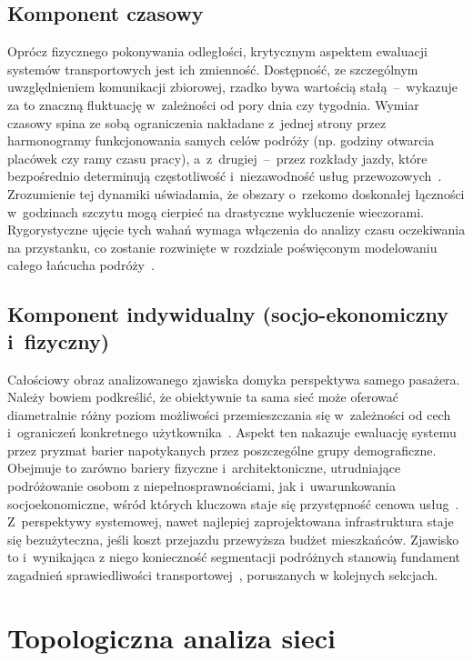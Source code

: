 \documentclass{pracamgr}
\begin{document}
\subsection{Komponent czasowy}\label{subsection:komponent_czasowy}
Oprócz fizycznego pokonywania odległości, krytycznym aspektem ewaluacji systemów transportowych jest ich zmienność. Dostępność, ze szczególnym uwzględnieniem komunikacji zbiorowej, rzadko bywa wartością stałą~–~wykazuje za to znaczną fluktuację w~zależności od pory dnia czy tygodnia. Wymiar czasowy spina ze sobą ograniczenia nakładane z~jednej strony przez harmonogramy funkcjonowania samych celów podróży (np. godziny otwarcia placówek czy ramy czasu pracy), a~z~drugiej~–~przez rozkłady jazdy, które bezpośrednio determinują częstotliwość i~niezawodność usług przewozowych~\cite{gravity2, capetown, review, LUO2019102505}. Zrozumienie tej dynamiki uświadamia, że obszary o~rzekomo doskonałej łączności w~godzinach szczytu mogą cierpieć na drastyczne wykluczenie wieczorami. Rygorystyczne ujęcie tych wahań wymaga włączenia do analizy czasu oczekiwania na przystanku, co zostanie rozwinięte w rozdziale poświęconym modelowaniu całego łańcucha podróży~\cite{capetown, LUO2019102505, elavating}.

\subsection{Komponent indywidualny (socjo-ekonomiczny i~fizyczny)}\label{subsection:komponent_indywidualny}
Całościowy obraz analizowanego zjawiska domyka perspektywa samego pasażera. Należy bowiem podkreślić, że obiektywnie ta sama sieć może oferować diametralnie różny poziom możliwości przemieszczania się w~zależności od cech i~ograniczeń konkretnego użytkownika~\cite{gravity2, capetown, mrt}. Aspekt ten nakazuje ewaluację systemu przez pryzmat barier napotykanych przez poszczególne grupy demograficzne. Obejmuje to zarówno bariery fizyczne i~architektoniczne, utrudniające podróżowanie osobom z niepełnosprawnościami, jak i~uwarunkowania socjoekonomiczne, wśród których kluczowa staje się przystępność cenowa usług~\cite{capetown, elavating}. Z~perspektywy systemowej, nawet najlepiej zaprojektowana infrastruktura staje się bezużyteczna, jeśli koszt przejazdu przewyższa budżet mieszkańców. Zjawisko to i~wynikająca z niego konieczność segmentacji podróżnych stanowią fundament zagadnień sprawiedliwości transportowej~\cite{capetown}, poruszanych w kolejnych sekcjach.


\section{Topologiczna analiza sieci}\label{section:analiza_topologiczna}
\end{document}
